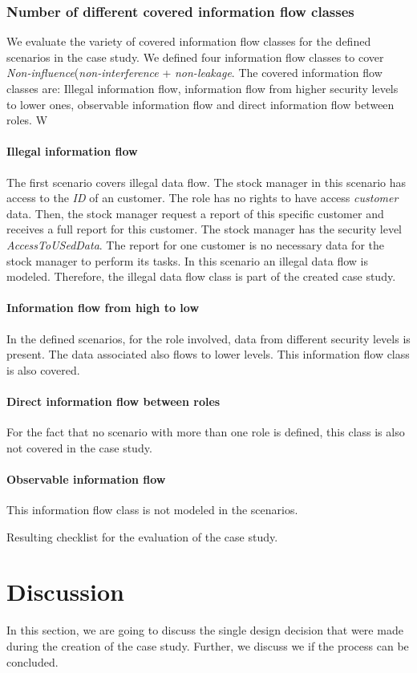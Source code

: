 \subsubsection{Number of different covered information flow classes}
We evaluate the variety of covered information flow classes for the defined scenarios in the case study. We defined four information flow classes to cover \textit{Non-influence}(\textit{non-interference} + \textit{non-leakage}. The covered information flow classes are: Illegal information flow, information flow from higher security levels to lower ones, observable information flow and direct information flow between roles. W
\paragraph{Illegal information flow}
The first scenario covers illegal data flow. The stock manager in this scenario has access to the \textit{ID} of an customer. The role has no rights to have access \textit{customer} data. Then, the stock manager request a report of this specific customer and receives a full report for this customer. The stock manager has the security level \textit{AccessToUSedData}. The report for one customer is no necessary data for the stock manager to perform its tasks. In this scenario an illegal data flow is modeled. Therefore, the illegal data flow class is part of the created case study.
\paragraph{Information flow from high to low}
In the defined scenarios, for the role involved, data from different security levels is present. The data associated also flows to lower levels. This information flow class is also covered.
\paragraph{Direct information flow between roles} For the fact that no scenario with more than one role is defined, this class is also not covered in the case study.
\paragraph{Observable information flow}
This information flow class is not modeled in the scenarios. 
\begin{table}

\caption{Resulting checklist for the evaluation of the case study.}
\end{table}

\section{Discussion}
In this section, we are going to discuss the single design decision that were made during the creation of the case study. Further, we discuss we if the process can be concluded.